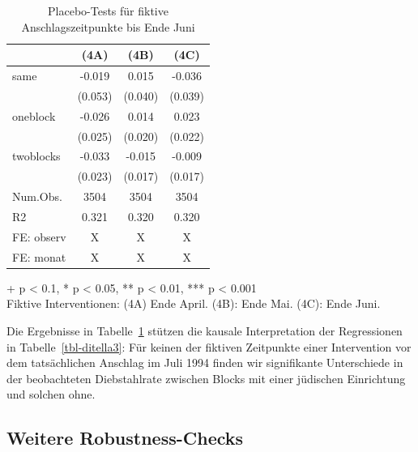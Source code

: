 \documentclass[
  a4paper,
  DIV=11,
  oneside]{scrreprt}
\begin{document}
\begingroup
\fontsize{12.0pt}{14.4pt}\selectfont
\setlength{\LTpost}{0mm}

\begin{longtable}{lccc}

\caption{\label{tbl-placebopp}Placebo-Tests für fiktive
Anschlagszeitpunkte bis Ende Juni}

\tabularnewline

\toprule
  & (4A) & (4B) & (4C) \\ 
\midrule\addlinespace[2.5pt]
same & -0.019 & 0.015 & -0.036 \\ 
 & (0.053) & (0.040) & (0.039) \\ 
oneblock & -0.026 & 0.014 & 0.023 \\ 
 & (0.025) & (0.020) & (0.022) \\ 
twoblocks & -0.033 & -0.015 & -0.009 \\ 
 & (0.023) & (0.017) & (0.017) \\ 
Num.Obs. & 3504 & 3504 & 3504 \\ 
R2 & 0.321 & 0.320 & 0.320 \\ 
FE: observ & X & X & X \\ 
FE: monat & X & X & X \\ 
\bottomrule

\end{longtable}

\begin{minipage}{\linewidth}
+ p < 0.1, * p < 0.05, ** p < 0.01, *** p < 0.001\\
Fiktive Interventionen: (4A) Ende April. (4B): Ende Mai. (4C): Ende Juni.\\
\end{minipage}
\endgroup

Die Ergebnisse in Tabelle~\ref{tbl-placebopp} stützen die kausale
Interpretation der Regressionen in Tabelle~\ref{tbl-ditella3}: Für
keinen der fiktiven Zeitpunkte einer Intervention vor dem tatsächlichen
Anschlag im Juli 1994 finden wir signifikante Unterschiede in der
beobachteten Diebstahlrate zwischen Blocks mit einer jüdischen
Einrichtung und solchen ohne.

\subsection{Weitere Robustness-Checks}\label{weitere-robustness-checks}
\end{document}
